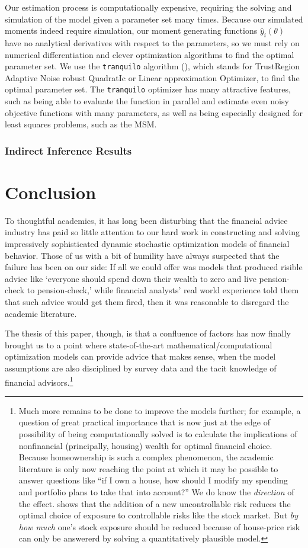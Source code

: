 \documentclass{article}
\begin{document}
Our estimation process is computationally expensive, requiring the solving and simulation of the model given a parameter set many times. Because our simulated moments indeed require simulation, our moment generating functions $\hat{y}_i(\theta)$ have no analytical derivatives with respect to the parameters, so we must rely on numerical differentiation and clever optimization algorithms to find the optimal parameter set. We use the \texttt{tranquilo} algorithm (\cite{Gabler2024}), which stands for TrustRegion Adaptive Noise robust QuadratIc or Linear approximation Optimizer, to find the optimal parameter set. The \texttt{tranquilo} optimizer has many attractive features, such as being able to evaluate the function in parallel and estimate even noisy objective functions with many parameters, as well as being especially designed for least squares problems, such as the MSM.

\subsubsection{Indirect Inference Results}

\section{Conclusion}

To thoughtful academics, it has long been disturbing that the financial advice industry has paid so little attention to our hard work in constructing and solving impressively sophisticated dynamic stochastic optimization models of financial behavior. Those of us with a bit of humility have always suspected that the failure has been on our side: If all we could offer was models that produced risible advice like `everyone should spend down their wealth to zero and live pension-check to pension-check,' while financial analysts' real world experience told them that such advice would get them fired, then it was reasonable to disregard the academic literature.

The thesis of this paper, though, is that a confluence of factors has now finally brought us to a point where state-of-the-art mathematical/computational optimization models can provide advice that makes sense, when the model assumptions are also disciplined by survey data and the tacit knowledge of financial advisors.\footnote{Much more remains to be done to improve the models further; for example, a question of great practical importance that is now just at the edge of possibility of being computationally solved is to calculate the implications of nonfinancial (principally, housing) wealth for optimal financial choice. Because homeownership is such a complex phenomenon, the academic literature is only now reaching the point at which it may be possible to answer questions like ``if I own a house, how should I modify my spending and portfolio plans to take that into account?'' We do know the \textit{direction} of the effect. \cite{kimballStandardRA} shows that the addition of a new uncontrollable risk reduces the optimal choice of exposure to controllable risks like the stock market. But \textit{by how much} one's stock exposure should be reduced because of house-price risk can only be answererd by solving a quantitatively plausible model.}
\end{document}
